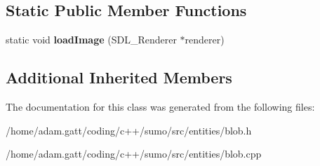 \subsection*{Static Public Member Functions}
\begin{DoxyCompactItemize}
\item 
\mbox{\label{classBlob_a760ae7e210c7900373a1042d37b43372}} 
static void {\bfseries load\+Image} (S\+D\+L\+\_\+\+Renderer $\ast$renderer)
\end{DoxyCompactItemize}
\subsection*{Additional Inherited Members}


The documentation for this class was generated from the following files\+:\begin{DoxyCompactItemize}
\item 
/home/adam.\+gatt/coding/c++/sumo/src/entities/blob.\+h\item 
/home/adam.\+gatt/coding/c++/sumo/src/entities/blob.\+cpp\end{DoxyCompactItemize}

